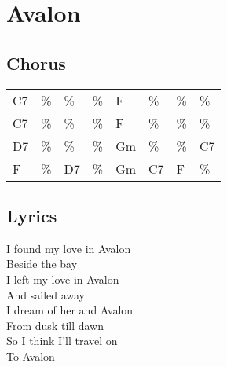 \section{Avalon}


\subsection*{Chorus}


\begin{tabular}{l l l l l l l l}
C7 & \% & \% & \% & F & \% & \% & \% \\ 
C7 & \% & \% & \% & F & \% & \% & \% \\ 
D7 & \% & \% & \% & Gm & \% & \% & C7 \\ 
F & \% & D7 & \% & Gm & C7 & F & \% \\ 
\end{tabular}


\subsection*{Lyrics}


I found my love in Avalon \\ 
Beside the bay \\ 
I left my love in Avalon \\ 
And sailed away \\ 
I dream of her and Avalon \\ 
From dusk till dawn \\ 
So I think I'll travel on \\ 
To Avalon \\ 
